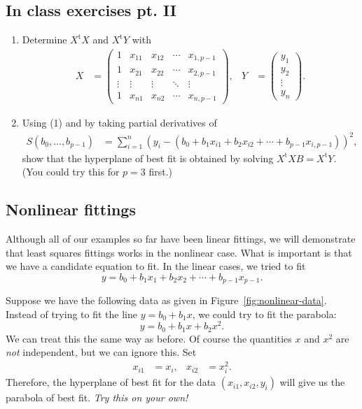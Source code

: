 \documentclass[a4paper, 12pt]{article}
\numberwithin{equation}{section}
\numberwithin{figure}{section}
\theoremstyle{definition}
\newcommand{\tr}{\mathrm{t}}
\begin{document}
\subsection{In class exercises pt. II}

\begin{enumerate}
	\item Determine $X^{\tr}X$ and $X^{\tr}Y$ with
	\begin{align*}
		X &= \begin{pmatrix}
			1 & x_{11} & x_{12} & \cdots & x_{1,p-1} \\
			1 & x_{21} & x_{22} & \cdots & x_{2,p-1} \\
			\vdots & \vdots & \vdots & \ddots & \vdots \\
			1 & x_{n1} & x_{n2} & \cdots & x_{n,p-1} 
		\end{pmatrix}, & 
		Y &= \begin{pmatrix}
			y_1 \\ y_2 \\ \vdots \\ y_n 
		\end{pmatrix}.
	\end{align*}
	\item Using (1) and by taking partial derivatives of 
	\begin{align}\label{eqn:S-function}
		S(b_0, \dots, b_{p-1}) &= \sum_{i=1}^n (y_i - (b_0 + b_1x_{i1} + b_2x_{i2} + \cdots + b_{p-1}x_{i,p-1}))^2,
	\end{align}
	show that the hyperplane of best fit is obtained by solving
	$X^{\tr}XB=X^{\tr}Y$. (You could try this for $p=3$ first.)
\end{enumerate}

\subsection{Nonlinear fittings}\label{sec:nonlinear-fittings}

Although all of our examples so far have been linear fittings, we will
demonstrate that least squares fittings works in the nonlinear case. What is
important is that we have a candidate equation to fit. In the linear cases, we
tried to fit 
\[ 
	y = b_0 + b_1x_1 + b_2x_2 + \cdots + b_{p-1}x_{p-1}.
\] 

Suppose we have the following data as given in Figure~\ref{fig:nonlinear-data}.
Instead of trying to fit the line $y=b_0+b_1x$, we could try to fit the
parabola: 
\[ 
	y = b_0 + b_1x + b_2x^2. 
\] 
We can treat this the same way as before. Of course the quantities $x$ and $x^2$ are \textit{not} independent, but we can ignore this. Set 
\begin{align*} 
	x_{i1} &= x_i, & x_{i2} &= x_i^2.
\end{align*} 
Therefore, the hyperplane of best fit for the data $(x_{i1}, x_{i2}, y_i)$ will
give us the parabola of best fit. \textit{Try this on your own!} 
\end{document}
